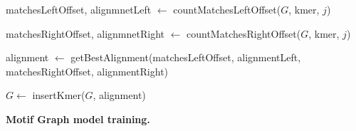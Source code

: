 \documentclass[a4paper, titlepage, 8pt, openright]{book}
\begin{document}
\begin{algorithm}
	\DontPrintSemicolon
	
	{
	}

	{
		matchesLeftOffset, alignmnetLeft $\gets$ countMatchesLeftOffset($G$, kmer, $j$)
	}

	{
		matchesRightOffset, alignmnetRight $\gets$ countMatchesRightOffset($G$, kmer, $j$)
	}	
	
	alignment $\gets$ getBestAlignment(matchesLeftOffset, alignmentLeft, matchesRightOffset, alignmentRight)

	$G \gets$ insertKmer($G$, alignment)

	\caption{\textbf{Motif Graph model training.}}
	\label{algo:mt_mg}
\end{algorithm}
\end{document}
